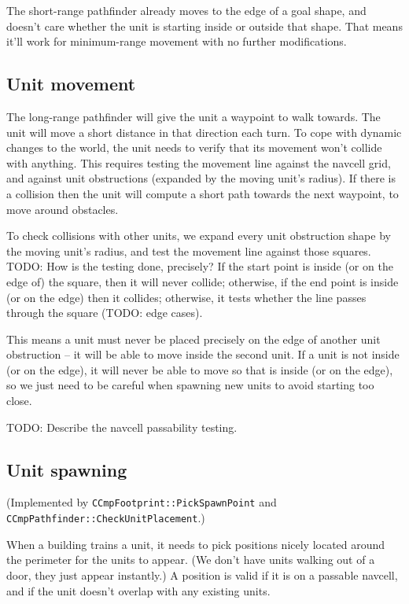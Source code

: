 \documentclass[a4paper,10pt]{article}
\begin{document}
The short-range pathfinder already moves to the edge of a goal shape,
and doesn't care whether the unit is starting inside or outside that shape.
That means it'll work for minimum-range movement with no further modifications.

\subsection{Unit movement}

The long-range pathfinder will give the unit a waypoint to walk towards.
The unit will move a short distance in that direction each turn.
To cope with dynamic changes to the world,
the unit needs to verify that its movement won't collide with anything.
This requires testing the movement line against the navcell grid,
and against unit obstructions (expanded by the moving unit's radius).
If there is a collision then the unit will compute a short path towards the next waypoint, to move around obstacles.

To check collisions with other units,
we expand every unit obstruction shape by the moving unit's radius,
and test the movement line against those squares.
TODO: How is the testing done, precisely?
If the start point is inside (or on the edge of) the square,
then it will never collide;
otherwise, if the end point is inside (or on the edge)
then it collides;
otherwise, it tests whether the line passes through the square
(TODO: edge cases).

This means a unit must never be placed precisely on the edge
of another unit obstruction -- it will be able to move inside the second unit.
If a unit is not inside (or on the edge),
it will never be able to move so that is inside (or on the edge),
so we just need to be careful when spawning new units to avoid starting too close.

TODO: Describe the navcell passability testing.

\subsection{Unit spawning}

(Implemented by \texttt{CCmpFootprint::PickSpawnPoint}
and \texttt{CCmpPathfinder::CheckUnitPlacement}.)

When a building trains a unit, it needs to pick positions nicely located
around the perimeter for the units to appear.
(We don't have units walking out of a door, they just appear instantly.)
A position is valid if it is on a passable navcell,
and if the unit doesn't overlap with any existing units.
\end{document}
